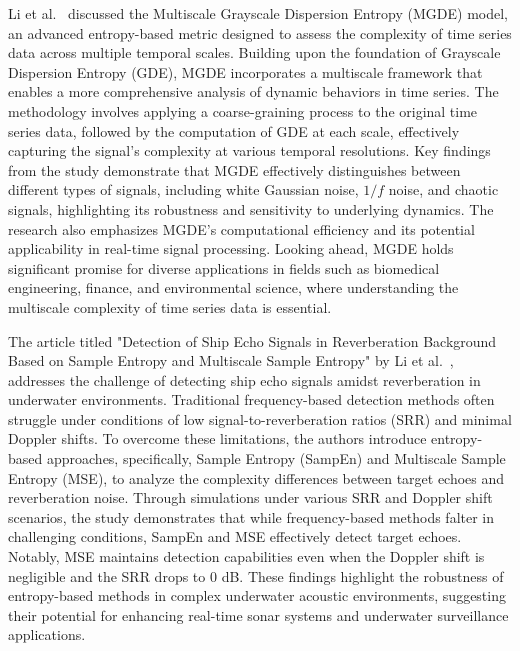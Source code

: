 Li et al.~\cite{Li2025} discussed the Multiscale Grayscale Dispersion Entropy (MGDE) model, an advanced entropy-based metric designed to assess the complexity of time series data across multiple temporal scales. Building upon the foundation of Grayscale Dispersion Entropy (GDE), MGDE incorporates a multiscale framework that enables a more comprehensive analysis of dynamic behaviors in time series. The methodology involves applying a coarse-graining process to the original time series data, followed by the computation of GDE at each scale, effectively capturing the signal's complexity at various temporal resolutions. Key findings from the study demonstrate that MGDE effectively distinguishes between different types of signals, including white Gaussian noise, $1/f$ noise, and chaotic signals, highlighting its robustness and sensitivity to underlying dynamics. The research also emphasizes MGDE's computational efficiency and its potential applicability in real-time signal processing. Looking ahead, MGDE holds significant promise for diverse applications in fields such as biomedical engineering, finance, and environmental science, where understanding the multiscale complexity of time series data is essential.

The article titled "Detection of Ship Echo Signals in Reverberation Background Based on Sample Entropy and Multiscale Sample Entropy" by Li et al.~\cite{Li2025a}, addresses the challenge of detecting ship echo signals amidst reverberation in underwater environments. Traditional frequency-based detection methods often struggle under conditions of low signal-to-reverberation ratios (SRR) and minimal Doppler shifts. To overcome these limitations, the authors introduce entropy-based approaches, specifically, Sample Entropy (SampEn) and Multiscale Sample Entropy (MSE), to analyze the complexity differences between target echoes and reverberation noise. Through simulations under various SRR and Doppler shift scenarios, the study demonstrates that while frequency-based methods falter in challenging conditions, SampEn and MSE effectively detect target echoes. Notably, MSE maintains detection capabilities even when the Doppler shift is negligible and the SRR drops to 0 dB. These findings highlight the robustness of entropy-based methods in complex underwater acoustic environments, suggesting their potential for enhancing real-time sonar systems and underwater surveillance applications.


